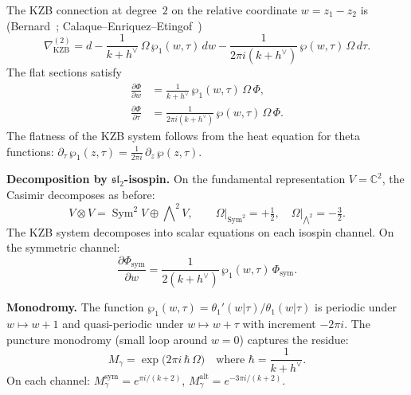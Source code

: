 \documentclass[11pt,reqno]{amsart}
\theoremstyle{definition}
\theoremstyle{remark}
\newcommand{\CC}{\mathbb{C}}
\numberwithin{equation}{section}
\begin{document}
The KZB connection at degree~$2$ on the relative coordinate
$w = z_1 - z_2$ is
\textup{(}Bernard~\cite{Bernard88};
Calaque--Enriquez--Etingof~\cite{CEE09}\textup{)}
\begin{equation}\label{eq:kzb-degree2}
  \nabla_{\mathrm{KZB}}^{(2)}
  = d
  - \frac{1}{k + h^\vee}\,
  \Omega\,\wp_1(w, \tau)\,dw
  - \frac{1}{2\pi i(k + h^\vee)}\,
  \wp(w, \tau)\,\Omega\,d\tau.
\end{equation}
The flat sections satisfy
\begin{align}
  \frac{\partial \Phi}{\partial w}
  &= \frac{1}{k + h^\vee}\,
  \wp_1(w, \tau)\,\Omega\,\Phi,
  \label{eq:kzb-w} \\
  \frac{\partial \Phi}{\partial \tau}
  &= \frac{1}{2\pi i(k + h^\vee)}\,
  \wp(w, \tau)\,\Omega\,\Phi.
  \label{eq:kzb-tau}
\end{align}
The flatness of the KZB system follows from the heat
equation for theta functions:
$\partial_\tau\,\wp_1(z, \tau)
= \frac{1}{2\pi i}\,\partial_z\,\wp(z, \tau)$.

\smallskip
\noindent
\textbf{Decomposition by $\mathfrak{sl}_2$-isospin.}
On the fundamental representation $V = \CC^2$, the
Casimir decomposes as before:
\[
  V \otimes V
  = \operatorname{Sym}^2 V \oplus \bigwedge\nolimits^2 V,
  \qquad
  \Omega\big|_{\operatorname{Sym}^2} = +\tfrac{1}{2},
  \quad
  \Omega\big|_{\bigwedge^2} = -\tfrac{3}{2}.
\]
The KZB system decomposes into scalar equations on each
isospin channel. On the symmetric channel:
\begin{equation}\label{eq:kzb-sym-channel}
  \frac{\partial \Phi_{\mathrm{sym}}}{\partial w}
  = \frac{1}{2(k + h^\vee)}\,\wp_1(w, \tau)\,
  \Phi_{\mathrm{sym}}.
\end{equation}

\smallskip
\noindent
\textbf{Monodromy.}
The function $\wp_1(w, \tau) = \theta_1'(w|\tau)/\theta_1(w|\tau)$
is periodic under $w \mapsto w + 1$ and quasi-periodic
under $w \mapsto w + \tau$ with increment $-2\pi i$.
The puncture monodromy (small loop around $w = 0$)
captures the residue:
\begin{equation}\label{eq:puncture-monodromy-ell}
  M_\gamma
  = \exp\!\bigl(2\pi i\,\hbar\,\Omega\bigr)
  \quad \text{where } \hbar = \frac{1}{k + h^\vee}.
\end{equation}
On each channel:
$M_\gamma^{\mathrm{sym}} = e^{\pi i/(k+2)}$,
$M_\gamma^{\mathrm{alt}} = e^{-3\pi i/(k+2)}$.
\end{document}
